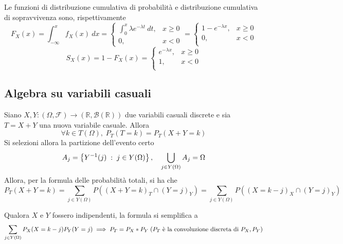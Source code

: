 \documentclass{article}
\begin{document}
                Le funzioni di distribuzione cumulativa di probabilità e distribuzione cumulativa di sopravvivenza sono, rispettivamente
                \[
                    F_{X}(x) = \int_{-\infty}^{x} f_{X}(x) \: dx =
                    \begin{cases}
                        \int_{0}^{x} \lambda e^{-\lambda t} \: dt, &x \geq 0 \\
                        0, &x < 0
                    \end{cases} = 
                    \begin{cases}
                        1 - e^{- \lambda x}, &x \geq 0 \\
                        0, &x < 0 \\
                    \end{cases}
                \]
                \[
                    S_{X}(x) = 1 - F_{X}(x) = 
                    \begin{cases}
                        e^{- \lambda x}, &x \geq 0 \\
                        1, &x < 0 \\
                    \end{cases}
                \]
        
        \vspace{10pt}
        \subsection{Algebra su variabili casuali}
            Siano $X, Y: (\Omega, \mathcal{F}) \rightarrow (\mathbb{R}, \mathcal{B}(\mathbb{R}))$ due variabili casuali discrete e sia $T = X + Y$ una nuova variabile casuale.
            Allora
            \[
                \forall k \in T(\Omega), \; P_{T}(T = k) = P_{T}(X + Y = k)
            \]
            Si selezioni allora la partizione dell'evento certo
            \[
                A_{j} = \qty{ Y^{-1}(j) \; : \; j \in Y(\Omega)}, \quad \bigcup_{j \in Y(\Omega)} A_{j} = \Omega
            \]
            Allora, per la formula delle probabilità totali, si ha che
            \[
                P_{T}(X + Y = k) = \sum_{j \in Y(\Omega)} P((X + Y = k)_{T} \cap (Y = j)_{Y}) = 
                \sum_{j \in Y(\Omega)} P((X = k - j)_{X} \cap (Y = j)_{Y})
            \]

            Qualora $X$ e $Y$ fossero indipendenti, la formula si semplifica a
            \[
                \sum_{j \in Y(\Omega)} P_{X}(X = k - j)P_{Y}(Y = j) \implies P_{T} = P_{X} * P_{Y} \; (P_{T} \textnormal{ è la convoluzione discreta di } P_{X}, P_{Y})
            \]
\end{document}
